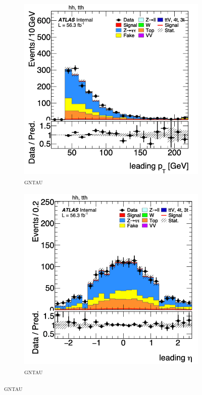   \begin{figure}[htbp]
    \centering
    \begin{subfigure}[b]{0.45\textwidth}
        \centering
        \includegraphics[width=\textwidth]{images/leading_pt_rnn.png}
        \caption{\textsc{gntau}}
    \end{subfigure}
    \begin{subfigure}[b]{0.45\textwidth}
        \centering
        \includegraphics[width=\textwidth]{images/leading_eta_rnn.png}
        \caption{\textsc{gntau}}
    \end{subfigure}


\end{figure}
